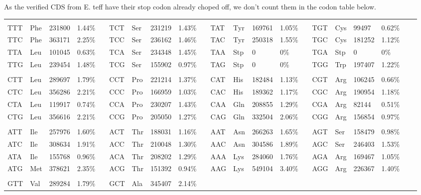 As the verified CDS from E. teff have their stop codon already choped off, we don't count them in the codon table below.\\
\begin{table}
\begin{center}
{\tiny
\begin{tabular}{*{21}{l}}
\hline
\\
TTT & Phe & 231800	& 1.44\%	&	&
TCT & Ser & 231219	& 1.43\%	&	&
TAT & Tyr & 169761	& 1.05\%	&	&
TGT & Cys & 99497	& 0.62\%	&	&
\\
TTC & Phe & 363171	& 2.25\%	&	&
TCC & Ser & 236162	& 1.46\%	&	&
TAC & Tyr & 250318	& 1.55\%	&	&
TGC & Cys & 181252	& 1.12\%	&	&
\\
TTA & Leu & 101045	& 0.63\%	&	&
TCA & Ser & 234348	& 1.45\%	&	&
TAA & Stp & 0	& 0\%	&	&
TGA & Stp & 0	& 0\%	&	&
\\
TTG & Leu & 239454	& 1.48\%	&	&
TCG & Ser & 155902	& 0.97\%	&	&
TAG & Stp & 0	& 0\%	&	&
TGG & Trp & 197407	& 1.22\%	&	&
\\
\\
CTT & Leu & 289697	& 1.79\%	&	&
CCT & Pro & 221214	& 1.37\%	&	&
CAT & His & 182484	& 1.13\%	&	&
CGT & Arg & 106245	& 0.66\%	&	&
\\
CTC & Leu & 356286	& 2.21\%	&	&
CCC & Pro & 166959	& 1.03\%	&	&
CAC & His & 189362	& 1.17\%	&	&
CGC & Arg & 190954	& 1.18\%	&	&
\\
CTA & Leu & 119917	& 0.74\%	&	&
CCA & Pro & 230207	& 1.43\%	&	&
CAA & Gln & 208855	& 1.29\%	&	&
CGA & Arg & 82144	& 0.51\%	&	&
\\
CTG & Leu & 356616	& 2.21\%	&	&
CCG & Pro & 205050	& 1.27\%	&	&
CAG & Gln & 332504	& 2.06\%	&	&
CGG & Arg & 156854	& 0.97\%	&	&
\\
\\
ATT & Ile & 257976	& 1.60\%	&	&
ACT & Thr & 188031	& 1.16\%	&	&
AAT & Asn & 266263	& 1.65\%	&	&
AGT & Ser & 158479	& 0.98\%	&	&
\\
ATC & Ile & 308634	& 1.91\%	&	&
ACC & Thr & 210048	& 1.30\%	&	&
AAC & Asn & 304586	& 1.89\%	&	&
AGC & Ser & 246403	& 1.53\%	&	&
\\
ATA & Ile & 155768	& 0.96\%	&	&
ACA & Thr & 208202	& 1.29\%	&	&
AAA & Lys & 284060	& 1.76\%	&	&
AGA & Arg & 169467	& 1.05\%	&	&
\\
ATG & Met & 378621	& 2.35\%	&	&
ACG & Thr & 151392	& 0.94\%	&	&
AAG & Lys & 549104	& 3.40\%	&	&
AGG & Arg & 226367	& 1.40\%	&	&
\\
\\
GTT & Val & 289284	& 1.79\%	&	&
GCT & Ala & 345407	& 2.14\%	&	&

\end{tabular}}
\end{center}
\end{table}
